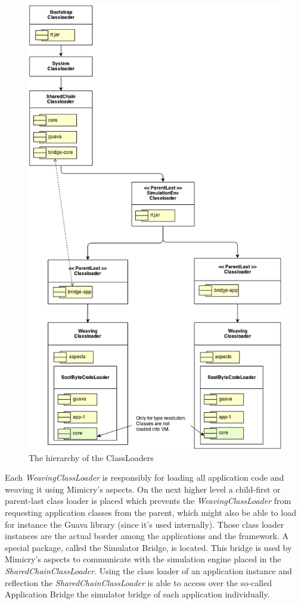 \documentclass[a4paper,oneside]{book}
\begin{document}
\begin{figure}
\begin{center}
\includegraphics[width=\textwidth]{ClassloaderHierarchy.png}
\caption{The hierarchy of the ClassLoaders}
\label{fig:ClassloaderHierarchy}
\end{center}
\end{figure}

Each \textit{WeavingClassLoader} is responsibly for loading all application code and weaving it using Mimicry's aspects. On the next higher level a child-first or parent-last class loader is placed which prevents the \textit{WeavingClassLoader} from requesting application classes from the parent, which might also be able to load for instance the Guava library (since it's used internally). Those class loader instances are the actual border among the applications and the framework. A special package, called the Simulator Bridge, is located. This bridge is used by Mimicry's aspects to communicate with the simulation engine placed in the \textit{SharedChainClassLoader}.
Using the class loader of an application instance and reflection the \textit{SharedChainClassLoader} is able to access over the so-called Application Bridge the simulator bridge of each application individually.
\end{document}
